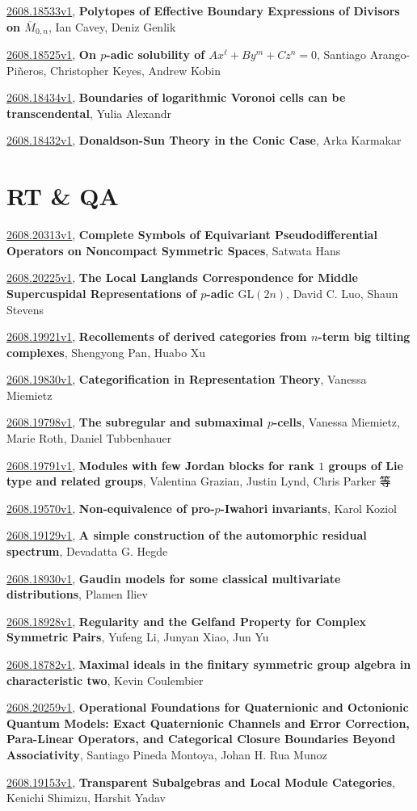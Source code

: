 \documentclass[9pt, a4paper]{article}
\theoremstyle{plain}
\theoremstyle{definition}
\theoremstyle{remark}
\newcommand{\arxiv}[3]{\href{https://arxiv.org/abs/#1}{#1}, \textbf{\textcolor{arxivblue}{#2}}, #3}
\begin{document}
\arxiv{2608.18533v1}{Polytopes of Effective Boundary Expressions of Divisors on $\overline{M}_{0,n}$}{Ian Cavey, Deniz Genlik}

\arxiv{2608.18525v1}{On $p$-adic solubility of $Ax^\ell + By^m + Cz^n = 0$}{Santiago Arango-Piñeros, Christopher Keyes, Andrew Kobin}

\arxiv{2608.18434v1}{Boundaries of logarithmic Voronoi cells can be transcendental}{Yulia Alexandr}

\arxiv{2608.18432v1}{Donaldson-Sun Theory in the Conic Case}{Arka Karmakar}


\section{RT \& QA}
\arxiv{2608.20313v1}{Complete Symbols of Equivariant Pseudodifferential Operators on Noncompact Symmetric Spaces}{Satwata Hans}

\arxiv{2608.20225v1}{The Local Langlands Correspondence for Middle Supercuspidal Representations of $p$-adic $\text{GL}(2n)$}{David C. Luo, Shaun Stevens}

\arxiv{2608.19921v1}{Recollements of derived categories from $n$-term big tilting complexes}{Shengyong Pan, Huabo Xu}

\arxiv{2608.19830v1}{Categorification in Representation Theory}{Vanessa Miemietz}

\arxiv{2608.19798v1}{The subregular and submaximal $p$-cells}{Vanessa Miemietz, Marie Roth, Daniel Tubbenhauer}

\arxiv{2608.19791v1}{Modules with few Jordan blocks for rank $1$ groups of Lie type and related groups}{Valentina Grazian, Justin Lynd, Chris Parker 等}

\arxiv{2608.19570v1}{Non-equivalence of pro-$p$-Iwahori invariants}{Karol Koziol}

\arxiv{2608.19129v1}{A simple construction of the automorphic residual spectrum}{Devadatta G. Hegde}

\arxiv{2608.18930v1}{Gaudin models for some classical multivariate distributions}{Plamen Iliev}

\arxiv{2608.18928v1}{Regularity and the Gelfand Property for Complex Symmetric Pairs}{Yufeng Li, Junyan Xiao, Jun Yu}

\arxiv{2608.18782v1}{Maximal ideals in the finitary symmetric group algebra in characteristic two}{Kevin Coulembier}

\arxiv{2608.20259v1}{Operational Foundations for Quaternionic and Octonionic Quantum Models: Exact Quaternionic Channels and Error Correction, Para-Linear Operators, and Categorical Closure Boundaries Beyond Associativity}{Santiago Pineda Montoya, Johan H. Rua Munoz}

\arxiv{2608.19153v1}{Transparent Subalgebras and Local Module Categories}{Kenichi Shimizu, Harshit Yadav}

\end{document}
